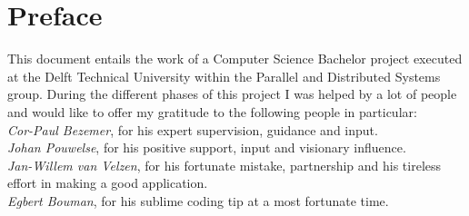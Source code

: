 \chapter*{Preface}
This document entails the work of a Computer Science Bachelor project executed at the Delft Technical University within the Parallel and Distributed Systems group. During the different phases of this project I was helped by a lot of people and would like to offer my gratitude to the following people in particular: \\

\emph{Cor-Paul Bezemer}, for his expert supervision, guidance and input.\\

\emph{Johan Pouwelse}, for his positive support, input and visionary influence.\\

\emph{Jan-Willem van Velzen}, for his fortunate mistake, partnership and his tireless effort in making a good application.\\

\emph{Egbert Bouman}, for his sublime coding tip at a most fortunate time.\\